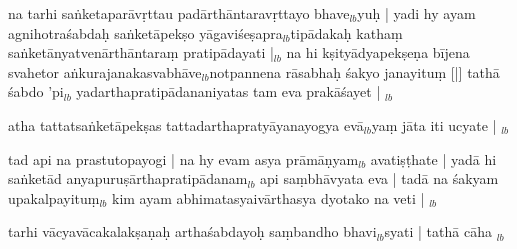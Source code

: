 \documentclass[article,12pt,a4paper]{memoir}%
\newcounter{parCount}
\begin{document}
	  
	  \pstart \leavevmode%
	na tarhi saṅketaparāvṛttau padārthāntaravṛttayo bhave{\tiny $_{lb}$}yuḥ | yadi hy ayam agnihotraśabdaḥ saṅketāpekṣo yāgaviśeṣapra{\tiny $_{lb}$}tipādakaḥ kathaṃ saṅketānyatvenārthāntaraṃ pratipādayati |{\tiny $_{lb}$} na hi kṣityādyapekṣeṇa bījena svahetor aṅkurajanakasvabhāve{\tiny $_{lb}$}notpannena rāsabhaḥ śakyo janayituṃ [|] tathā śabdo 'pi{\tiny $_{lb}$} yadarthapratipādananiyatas tam eva prakāśayet |
	{}
	\pend%
      {\tiny $_{lb}$}

	  
	  \pstart \leavevmode%
	atha tattatsaṅketāpekṣas tattadarthapratyāyanayogya evā{\tiny $_{lb}$}yaṃ jāta iti ucyate |
	{}
	\pend%
      {\tiny $_{lb}$}

	  
	  \pstart \leavevmode%
	tad api na prastutopayogi | na hy evam asya prāmāṇyam{\tiny $_{lb}$} avatiṣṭhate | yadā hi saṅketād anyapuruṣārthapratipādanam{\tiny $_{lb}$} api saṃbhāvyata eva | tadā na \leavevmode{} śakyam upakalpayituṃ{\tiny $_{lb}$} kim ayam abhimatasyaivārthasya dyotako na veti |
	{}
	\pend%
      {\tiny $_{lb}$}

	  
	  \pstart \leavevmode%
	tarhi vācyavācakalakṣaṇaḥ arthaśabdayoḥ saṃbandho bhavi{\tiny $_{lb}$}syati | tathā cāha
	{}
	\pend%
      {\tiny $_{lb}$}
	    
\end{document}
